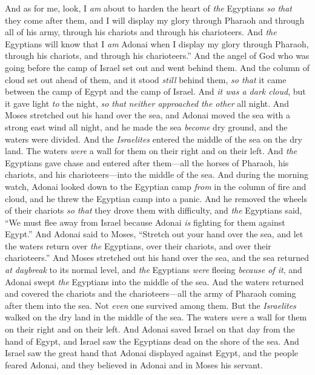 \begin{biblechapter}
\verse And as for me, look, I \textit{am} about to harden the heart of \textit{the} Egyptians \textit{so that} they come after them, and I will display my glory through Pharaoh and through all of his army, through his chariots and through his charioteers.
\verse And \textit{the} Egyptians will know that I \textit{am} Adonai when I display my glory through Pharaoh, through his chariots, and through his charioteers.”
\verse And the angel of God who was going before the camp of Israel set out and went behind them. And the column of cloud set out ahead of them, and it stood \textit{still} behind them,
\verse \textit{so that} it came between the camp of Egypt and the camp of Israel. And \textit{it was a dark cloud}, but it gave light \textit{to} the night, \textit{so that} \textit{neither approached the other} all night.
\verse And Moses stretched out his hand over the sea, and Adonai moved the sea with a strong east wind all night, and he made the sea \textit{become} dry ground, and the waters were divided.
\verse And the \textit{Israelites} entered the middle of the sea on the dry land. The waters \textit{were} a wall for them on their right and on their left.
\verse And \textit{the} Egyptians gave chase and entered after them—all the horses of Pharaoh, his chariots, and his charioteers—into the middle of the sea.
\verse And during the morning watch, Adonai looked down to the Egyptian camp \textit{from} in the column of fire and cloud, and he threw the Egyptian camp into a panic.
\verse And he removed the wheels of their chariots \textit{so that} they drove them with difficulty, and \textit{the} Egyptians said, “We must flee away from Israel because Adonai \textit{is} fighting for them against Egypt.”
\verse And Adonai said to Moses, “Stretch out your hand over the sea, and let the waters return over \textit{the} Egyptians, over their chariots, and over their charioteers.”
\verse And Moses stretched out his hand over the sea, and the sea returned \textit{at daybreak} to its normal level, and \textit{the} Egyptians \textit{were} fleeing \textit{because of it}, and Adonai swept \textit{the} Egyptians into the middle of the sea.
\verse And the waters returned and covered the chariots and the charioteers—all the army of Pharaoh coming after them into the sea. Not \textit{even} one survived among them.
\verse But the \textit{Israelites} walked on the dry land in the middle of the sea. The waters \textit{were} a wall for them on their right and on their left.
\verse And Adonai saved Israel on that day from the hand of Egypt, and Israel saw the Egyptians dead on the shore of the sea.
\verse And Israel saw the great hand that Adonai displayed against Egypt, and the people feared Adonai, and they believed in Adonai and in Moses his servant.
\end{biblechapter}

